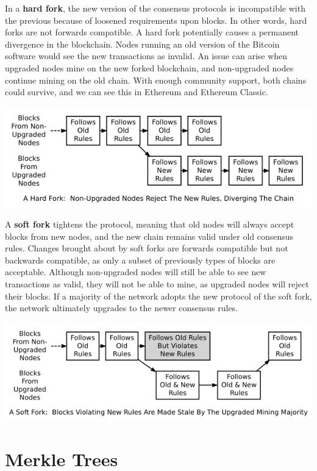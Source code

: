 \documentclass[11pt]{article}
\begin{document}
   In a \textbf{hard fork}, the new version of the consensus protocols is incompatible with the previous because of loosened requirements upon blocks. In other words, hard forks are not forwards compatible. A hard fork potentially causes a permanent divergence in the blockchain. Nodes running an old version of the Bitcoin software would see the new transactions as invalid. An issue can arise when upgraded nodes mine on the new forked blockchain, and non-upgraded nodes continue mining on the old chain. With enough community support, both chains could survive, and we can see this in Ethereum and Ethereum Classic.
   
   \smallskip
   \includegraphics[scale=0.9]{hard_fork}
   \smallskip
   
   A \textbf{soft fork} tightens the protocol, meaning that old nodes will always accept blocks from new nodes, and the new chain remains valid under old consensus rules. Changes brought about by soft forks are forwards compatible but not backwards compatible, as only a subset of previously types of blocks are acceptable. Although non-upgraded nodes will still be able to see new transactions as valid, they will not be able to mine, as upgraded nodes will reject their blocks. If a majority of the network adopts the new protocol of the soft fork, the network ultimately upgrades to the newer consensus rules.
   
   \medskip   
   \includegraphics[scale=0.9]{soft_fork}
  
   \section*{Merkle Trees}
  
\end{document}
